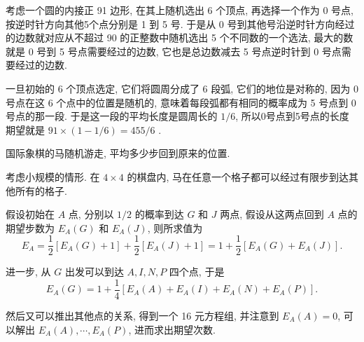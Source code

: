 考虑一个圆的内接正 91 边形, 在其上随机选出 6 个顶点, 再选择一个作为 0 号点, 按逆时针方向其他5个点分别是 1 到 5 号. 于是从 0 号到其他号沿逆时针方向经过的边数就对应从不超过 90 的正整数中随机选出 5 个不同数的一个选法, 最大的数就是 0 号到 5 号点需要经过的边数, 它也是总边数减去 5 号点逆时针到 0 号点需要经过的边数. 

一旦初始的 6 个顶点选定, 它们将圆周分成了 6 段弧, 它们的地位是对称的, 因为 0 号点在这 6 个点中的位置是随机的, 意味着每段弧都有相同的概率成为 5 号点到 0 号点的那一段. 于是这一段的平均长度是圆周长的 $1/6$, 所以0号点到5号点的长度期望就是 $91\times(1-1/6) = 455/6$ .

\newpage

国际象棋的马随机游走, 平均多少步回到原来的位置.
\begin{figure*}[htbp]
\centering
{}
\end{figure*}

考虑小规模的情形. 在 $ 4\times 4 $ 的棋盘内, 马在任意一个格子都可以经过有限步到达其他所有的格子. 

假设初始在 $ A $ 点, 分别以 $ 1/2 $ 的概率到达 $ G $ 和 $ J $ 两点, 假设从这两点回到 $ A $ 点的期望步数为 $ E_A(G) $ 和 $ E_A(J) $, 则所求值为 
\[ E_A = \frac{1}{2}[E_A(G) + 1] + \frac{1}{2}[E_A(J)+1] = 1 + \frac{1}{2}[E_A(G)+E_A(J)]. \]

进一步, 从 $ G $ 出发可以到达 $ A, I, N, P $ 四个点, 于是
\[ E_A(G)= 1+\frac{1}{4}[ E_A(A) + E_A(I) + E_A(N) + E_A(P) ]. \]

然后又可以推出其他点的关系, 得到一个 16 元方程组, 并注意到 $ E_A(A)=0 $, 可以解出 $ E_A(A),\cdots,E_A(P) $, 进而求出期望次数.

